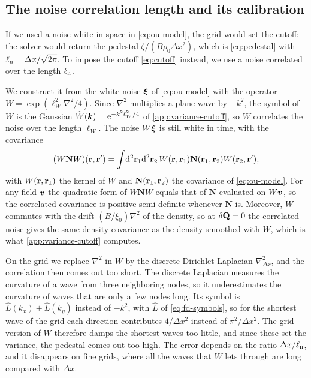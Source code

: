 \documentclass[aps,pre,reprint,superscriptaddress,longbibliography,nofootinbib
]{revtex4-2}
\begin{document}
\subsection{\texorpdfstring{The noise correlation length and its
calibration}{The noise correlation length and its
calibration}}
\label{app:lyapunov-cutoff}
If we used a noise white in space in \cref{eq:ou-model},
the grid would set the cutoff: the solver would return the
pedestal $\zeta/(B\rho_0\Delta x^2)$, which is
\cref{eq:pedestal} with $\ell_{\rm n}=\Delta x/\sqrt{2\pi}$. To
impose the cutoff \cref{eq:cutoff} instead, we use a noise
correlated over the length $\ell_{\rm n}$.

We construct it from the white noise $\boldsymbol{\xi}$ of
\cref{eq:ou-model} with the operator
$W=\exp(\ell_W^2\nabla^2/4)$. Since $\nabla^2$ multiplies a
plane wave by $-k^2$, the symbol of $W$ is the Gaussian
$\tilde W(\boldsymbol{k})=\mathrm{e}^{-k^2\ell_W^2/4}$ of
\cref{app:variance-cutoff}, so $W$ correlates the noise
over the length $\ell_W$. The noise $W\boldsymbol{\xi}$ is still white
in time, with the covariance
\begin{equation*}
  (W\mathbf NW)(\mathbf{r},\mathbf{r}')=\int\!\mathrm{d}^2\mathbf{r}_1\mathrm{d}^2\mathbf{r}_2\,W(\mathbf{r},\mathbf{r}_1)\mathbf N(\mathbf{r}_1,\mathbf{r}_2)W(\mathbf{r}_2,\mathbf{r}'),
\end{equation*}
with $W(\mathbf{r},\mathbf{r}_1)$ the kernel of $W$ and $\mathbf
N(\mathbf{r}_1,\mathbf{r}_2)$ the covariance of \cref{eq:ou-model}. For any
field $\boldsymbol v$ the quadratic form of $W\mathbf NW$ equals
that of $\mathbf N$ evaluated on $W\boldsymbol v$, so the
correlated covariance is positive semi-definite whenever
$\mathbf N$ is. Moreover, $W$ commutes with the drift
$(B/\xi_0)\nabla^2$ of the density, so at $\delta\mathbf{Q}=0$ the
correlated noise gives the same density covariance as the
density smoothed with $W$, which is what
\cref{app:variance-cutoff} computes.

On the grid we replace $\nabla^2$ in $W$ by the discrete
Dirichlet Laplacian $\nabla^2_{\Delta x}$, and the
correlation then comes out too short. The discrete
Laplacian measures the curvature of a wave from three
neighboring nodes, so it underestimates the curvature of
waves that are only a few nodes long. Its symbol is $\hat
L(k_x)+\hat L(k_y)$ instead of $-k^2$, with $\hat L$ of
\cref{eq:fd-symbols}, so for the shortest wave of the grid
each direction contributes $4/\Delta x^2$ instead of
$\pi^2/\Delta x^2$. The grid version of $W$ therefore damps
the shortest waves too little, and since these set the
variance, the pedestal comes out too high. The error
depends on the ratio $\Delta x/\ell_{\rm n}$, and it disappears on
fine grids, where all the waves that $W$ lets through are
long compared with $\Delta x$.
\end{document}

